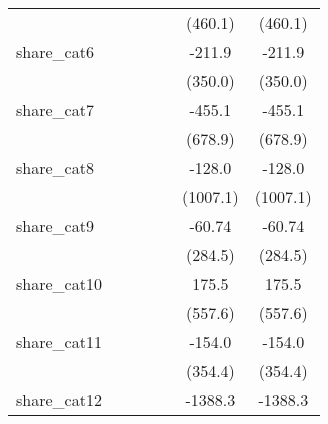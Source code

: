 {\begin{tabular}{l*{6}{c}}
            &                     &                     &                     &                     &     (460.1)         &     (460.1)         \\
[1em]
share\_cat6  &                     &                     &                     &                     &      -211.9         &      -211.9         \\
            &                     &                     &                     &                     &     (350.0)         &     (350.0)         \\
[1em]
share\_cat7  &                     &                     &                     &                     &      -455.1         &      -455.1         \\
            &                     &                     &                     &                     &     (678.9)         &     (678.9)         \\
[1em]
share\_cat8  &                     &                     &                     &                     &      -128.0         &      -128.0         \\
            &                     &                     &                     &                     &    (1007.1)         &    (1007.1)         \\
[1em]
share\_cat9  &                     &                     &                     &                     &      -60.74         &      -60.74         \\
            &                     &                     &                     &                     &     (284.5)         &     (284.5)         \\
[1em]
share\_cat10 &                     &                     &                     &                     &       175.5         &       175.5         \\
            &                     &                     &                     &                     &     (557.6)         &     (557.6)         \\
[1em]
share\_cat11 &                     &                     &                     &                     &      -154.0         &      -154.0         \\
            &                     &                     &                     &                     &     (354.4)         &     (354.4)         \\
[1em]
share\_cat12 &                     &                     &                     &                     &     -1388.3         &     -1388.3         \\

\end{tabular}}
